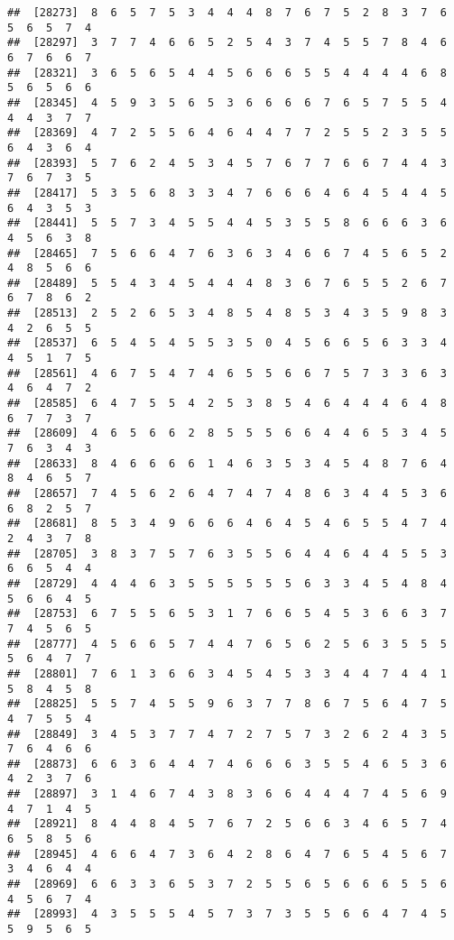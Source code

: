 \documentclass[
]{book}
\begin{document}
\begin{verbatim}
##  [28273]  8  6  5  7  5  3  4  4  4  8  7  6  7  5  2  8  3  7  6  5  6  5  7  4
##  [28297]  3  7  7  4  6  6  5  2  5  4  3  7  4  5  5  7  8  4  6  6  7  6  6  7
##  [28321]  3  6  5  6  5  4  4  5  6  6  6  5  5  4  4  4  4  6  8  5  6  5  6  6
##  [28345]  4  5  9  3  5  6  5  3  6  6  6  6  7  6  5  7  5  5  4  4  4  3  7  7
##  [28369]  4  7  2  5  5  6  4  6  4  4  7  7  2  5  5  2  3  5  5  6  4  3  6  4
##  [28393]  5  7  6  2  4  5  3  4  5  7  6  7  7  6  6  7  4  4  3  7  6  7  3  5
##  [28417]  5  3  5  6  8  3  3  4  7  6  6  6  4  6  4  5  4  4  5  6  4  3  5  3
##  [28441]  5  5  7  3  4  5  5  4  4  5  3  5  5  8  6  6  6  3  6  4  5  6  3  8
##  [28465]  7  5  6  6  4  7  6  3  6  3  4  6  6  7  4  5  6  5  2  4  8  5  6  6
##  [28489]  5  5  4  3  4  5  4  4  4  8  3  6  7  6  5  5  2  6  7  6  7  8  6  2
##  [28513]  2  5  2  6  5  3  4  8  5  4  8  5  3  4  3  5  9  8  3  4  2  6  5  5
##  [28537]  6  5  4  5  4  5  5  3  5  0  4  5  6  6  5  6  3  3  4  4  5  1  7  5
##  [28561]  4  6  7  5  4  7  4  6  5  5  6  6  7  5  7  3  3  6  3  4  6  4  7  2
##  [28585]  6  4  7  5  5  4  2  5  3  8  5  4  6  4  4  4  6  4  8  6  7  7  3  7
##  [28609]  4  6  5  6  6  2  8  5  5  5  6  6  4  4  6  5  3  4  5  7  6  3  4  3
##  [28633]  8  4  6  6  6  6  1  4  6  3  5  3  4  5  4  8  7  6  4  8  4  6  5  7
##  [28657]  7  4  5  6  2  6  4  7  4  7  4  8  6  3  4  4  5  3  6  6  8  2  5  7
##  [28681]  8  5  3  4  9  6  6  6  4  6  4  5  4  6  5  5  4  7  4  2  4  3  7  8
##  [28705]  3  8  3  7  5  7  6  3  5  5  6  4  4  6  4  4  5  5  3  6  6  5  4  4
##  [28729]  4  4  4  6  3  5  5  5  5  5  5  6  3  3  4  5  4  8  4  5  6  6  4  5
##  [28753]  6  7  5  5  6  5  3  1  7  6  6  5  4  5  3  6  6  3  7  7  4  5  6  5
##  [28777]  4  5  6  6  5  7  4  4  7  6  5  6  2  5  6  3  5  5  5  5  6  4  7  7
##  [28801]  7  6  1  3  6  6  3  4  5  4  5  3  3  4  4  7  4  4  1  5  8  4  5  8
##  [28825]  5  5  7  4  5  5  9  6  3  7  7  8  6  7  5  6  4  7  5  4  7  5  5  4
##  [28849]  3  4  5  3  7  7  4  7  2  7  5  7  3  2  6  2  4  3  5  7  6  4  6  6
##  [28873]  6  6  3  6  4  4  7  4  6  6  6  3  5  5  4  6  5  3  6  4  2  3  7  6
##  [28897]  3  1  4  6  7  4  3  8  3  6  6  4  4  4  7  4  5  6  9  4  7  1  4  5
##  [28921]  8  4  4  8  4  5  7  6  7  2  5  6  6  3  4  6  5  7  4  6  5  8  5  6
##  [28945]  4  6  6  4  7  3  6  4  2  8  6  4  7  6  5  4  5  6  7  3  4  6  4  4
##  [28969]  6  6  3  3  6  5  3  7  2  5  5  6  5  6  6  6  5  5  6  4  5  6  7  4
##  [28993]  4  3  5  5  5  4  5  7  3  7  3  5  5  6  6  4  7  4  5  5  9  5  6  5

\end{verbatim}
\end{document}
